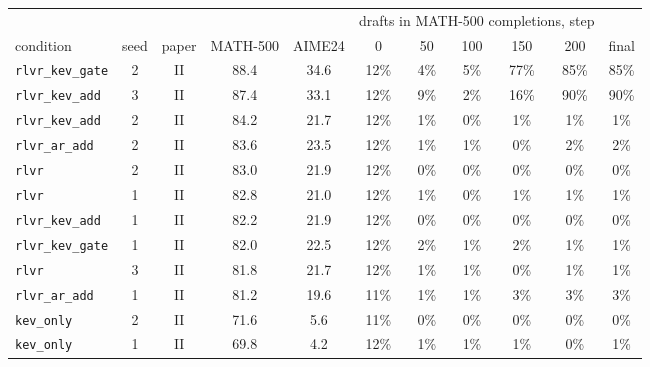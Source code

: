 \begin{tabular}{@{}lcccccccccc@{}}
\toprule
 & & & & & \multicolumn{5}{c}{drafts in MATH-500 completions, step} & \\ \cmidrule(lr){6-10}
condition & seed & paper & MATH-500 & AIME24 & 0 & 50 & 100 & 150 & 200 & final \\ \midrule
\texttt{rlvr\_kev\_gate} & 2 & II & 88.4 & 34.6 & 12\% & 4\% & 5\% & 77\% & 85\% & 85\% \\
\texttt{rlvr\_kev\_add} & 3 & II & 87.4 & 33.1 & 12\% & 9\% & 2\% & 16\% & 90\% & 90\% \\
\midrule
\texttt{rlvr\_kev\_add} & 2 & II & 84.2 & 21.7 & 12\% & 1\% & 0\% & 1\% & 1\% & 1\% \\
\texttt{rlvr\_ar\_add} & 2 & II & 83.6 & 23.5 & 12\% & 1\% & 1\% & 0\% & 2\% & 2\% \\
\texttt{rlvr} & 2 & II & 83.0 & 21.9 & 12\% & 0\% & 0\% & 0\% & 0\% & 0\% \\
\texttt{rlvr} & 1 & II & 82.8 & 21.0 & 12\% & 1\% & 0\% & 1\% & 1\% & 1\% \\
\texttt{rlvr\_kev\_add} & 1 & II & 82.2 & 21.9 & 12\% & 0\% & 0\% & 0\% & 0\% & 0\% \\
\texttt{rlvr\_kev\_gate} & 1 & II & 82.0 & 22.5 & 12\% & 2\% & 1\% & 2\% & 1\% & 1\% \\
\texttt{rlvr} & 3 & II & 81.8 & 21.7 & 12\% & 1\% & 1\% & 0\% & 1\% & 1\% \\
\texttt{rlvr\_ar\_add} & 1 & II & 81.2 & 19.6 & 11\% & 1\% & 1\% & 3\% & 3\% & 3\% \\
\texttt{kev\_only} & 2 & II & 71.6 & 5.6 & 11\% & 0\% & 0\% & 0\% & 0\% & 0\% \\
\texttt{kev\_only} & 1 & II & 69.8 & 4.2 & 12\% & 1\% & 1\% & 1\% & 0\% & 1\% \\
\bottomrule
\end{tabular}
